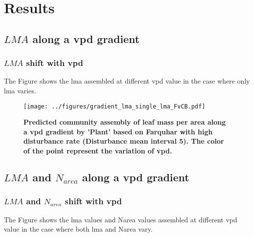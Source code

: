 \documentclass[a4paper,11pt]{article}
\begin{document}
\clearpage

\section{Results}


\subsection{$LMA$ along a vpd gradient}


\subsubsection{$LMA$  shift with vpd}

The Figure \label{fig:lma_vpd} shows the lma assembled at different
vpd value in the case where only lma varies.

\begin{figure}[H]
\centering
\texttt{[image: ../figures/gradient\_lma\_single\_lma\_FvCB.pdf]}
\caption{\textbf{Predicted community assembly of leaf mass per area along a vpd gradient by 'Plant' based on Farquhar with high disturbance rate (Disturbance mean interval 5). The color of the point represent the variation of vpd.}
\label{fig:lma_vpd}}
\end{figure}

\pagebreak[3]

\subsection{$LMA$ and $N_{area}$ along a vpd gradient}

\subsubsection{$LMA$ and $N_{area}$ shift with vpd}

The Figure \label{fig:lma_nareaFh2} shows the lma values and Narea values assembled at different
vpd value in the case where both lma and Narea vary.


\end{document}
